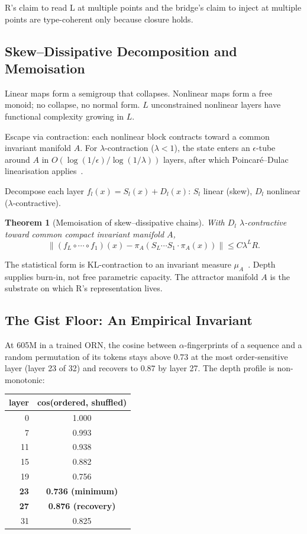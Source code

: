 \documentclass[10pt, twocolumn, a4paper]{article}
\newtheorem{theorem}{Theorem}
\begin{document}
R's claim to read L at multiple points and the bridge's claim to inject at multiple points are type-coherent only because closure holds.

\subsection{Skew--Dissipative Decomposition and Memoisation}

Linear maps form a semigroup that collapses. Nonlinear maps form a free monoid; no collapse, no normal form. $L$ unconstrained nonlinear layers have functional complexity growing in $L$.

Escape via contraction: each nonlinear block contracts toward a common invariant manifold $A$. For $\lambda$-contraction ($\lambda < 1$), the state enters an $\epsilon$-tube around $A$ in $O(\log(1/\epsilon) / \log(1/\lambda))$ layers, after which Poincaré--Dulac linearisation applies~\cite{sternberg}.

Decompose each layer $f_l(x) = S_l(x) + D_l(x)$: $S_l$ linear (skew), $D_l$ nonlinear ($\lambda$-contractive).

\begin{theorem}[Memoisation of skew--dissipative chains]
With $D_l$ $\lambda$-contractive toward common compact invariant manifold $A$,
\[ \| (f_L \circ \cdots \circ f_1)(x) - \pi_A (S_L \cdots S_1 \cdot \pi_A(x)) \| \leq C \lambda^L R. \]
\end{theorem}

The statistical form is KL-contraction to an invariant measure $\mu_A$~\cite{meyn-tweedie}. Depth supplies burn-in, not free parametric capacity. The attractor manifold $A$ is the substrate on which R's representation lives.

\subsection{The Gist Floor: An Empirical Invariant}

At 605M in a trained ORN, the cosine between $\alpha$-fingerprints of a sequence and a random permutation of its tokens stays above $0.73$ at the most order-sensitive layer (layer 23 of 32) and recovers to $0.87$ by layer 27. The depth profile is non-monotonic:

\begin{center}\small
\begin{tabular}{rc}
\toprule
layer & cos(ordered, shuffled) \\
\midrule
0 & 1.000 \\
7 & 0.993 \\
11 & 0.938 \\
15 & 0.882 \\
19 & 0.756 \\
\textbf{23} & \textbf{0.736 (minimum)} \\
\textbf{27} & \textbf{0.876 (recovery)} \\
31 & 0.825 \\
\bottomrule
\end{tabular}
\end{center}
\end{document}
